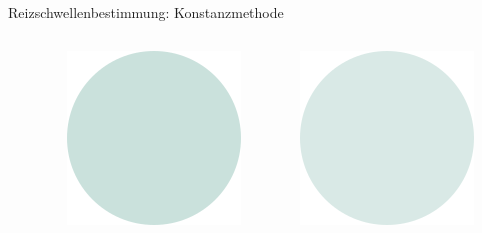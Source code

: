 \documentclass[aspectratio=169]{beamer}
\begin{document}
\begin{frame}{Reizschwellenbestimmung: Konstanzmethode}
\begin{columns}[c]
\begin{column}{1.5cm}
\end{column}
\begin{column}{1.5cm}
\includegraphics[width=\textwidth]{reizschwelle_seriell_8.png}
\end{column}
\begin{column}{1.5cm}
\includegraphics[width=\textwidth]{reizschwelle_seriell_6.png}

\end{column}
\end{columns}
\end{frame}
\end{document}
